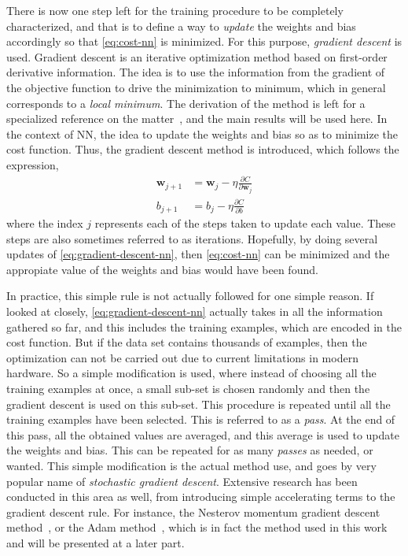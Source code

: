 There is now one step left for the training procedure to be completely characterized, and 
that is to define a way to \emph{update} the weights and bias accordingly so that 
\autoref{eq:cost-nn} is minimized. For this purpose, \emph{gradient descent} is used. 
Gradient descent is an iterative optimization method based on first-order derivative 
information. The idea is to use the information from the gradient of the objective function 
to drive the minimization to minimum, which in general corresponds to a \emph{local minimum}. The derivation of the method is left for a specialized reference on the 
matter~\cite{nocedalNumericalOptimization2006}, and the main results will be used here. In 
the context of NN, the idea to update the weights and bias so as to minimize the cost 
function. Thus, the gradient descent method is introduced, which follows the expression,
\begin{equation}
    \begin{aligned}
        \mathbf{w}_{j+1} &= \mathbf{w}_{j} - \eta \frac{\partial C}{\partial \mathbf{w}_{j}} \\
        b_{j+1} &= b_{j} - \eta \frac{\partial C}{\partial b}
    \end{aligned}
    \label{eq:gradient-descent-nn}
\end{equation}
where the index \(j\) represents each of the steps taken to update each value. These steps 
are also sometimes referred to as iterations. Hopefully, by doing several updates of 
\autoref{eq:gradient-descent-nn}, then \autoref{eq:cost-nn} can be minimized and the 
appropiate value of the weights and bias would have been found.

In practice, this simple rule is not actually followed for one simple reason. If looked at 
closely, \autoref{eq:gradient-descent-nn} actually takes in all the information gathered so 
far, and this includes the training examples, which are encoded in the cost function. But 
if the data set contains thousands of examples, then the optimization can not be carried 
out due to current limitations in modern hardware. So a simple modification is used, where 
instead of choosing all the training examples at once, a small sub-set is chosen randomly 
and then the gradient descent is used on this sub-set. 
This procedure is repeated until all the 
training examples have been selected. This is referred to as a 
\emph{pass}. At the end of this pass, all the obtained values are averaged, and this 
average is used to update the weights and bias. This can be repeated for as many 
\emph{passes} as needed, or wanted. This simple modification is the actual 
method use, and goes by very popular name of \emph{stochastic gradient descent}.
Extensive research has been conducted in this area as well, from introducing simple
accelerating terms to the gradient descent rule. For instance, the Nesterov momentum 
gradient descent method~\cite{ruderOverviewGradientDescent2017}, or the Adam 
method~\cite{kingmaAdamMethodStochastic2017}, which is in fact the method used in this work 
and will be presented at a later part.

